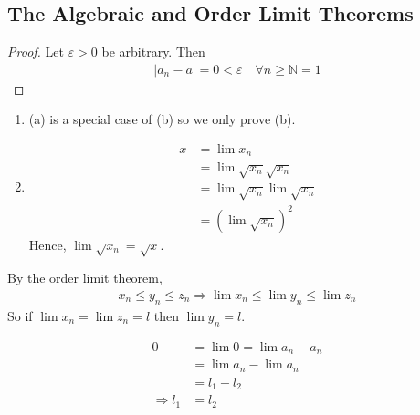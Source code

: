 \subsection{The Algebraic and Order Limit Theorems}

\begin{proof}
    Let $\varepsilon > 0$ be arbitrary. Then 
    \begin{align*}
        |a_n - a| = 0 < \varepsilon \quad \forall n \geq \mathbb{N} = 1
    \end{align*}
\end{proof}

\begin{enumerate}[label=(\alph*)]
    \item 
    (a) is a special case of (b) so we only prove (b).

    \item 
    \begin{align*}
        x &= \lim x_n \\
        &= \lim{\sqrt{x_n} \sqrt{x_n}} \\
        &= \lim \sqrt{x_n} \lim \sqrt{x_n} \\
        &= (\lim \sqrt{x_n})^2 
    \end{align*}
    Hence, $\lim \sqrt{x_n} = \sqrt x$.
\end{enumerate}


By the order limit theorem,
\begin{align*}
    x_n \leq y_n \leq z_n \Rightarrow \lim x_n \leq \lim  y_n \leq \lim z_n
\end{align*}
So if $\lim x_n = \lim z_n = l$ then $\lim y_n = l$.

\begin{align*}
    0 &= \lim 0 = \lim{a_n - a_n} \\
    &= \lim a_n - \lim a_n \\
    &= l_1 - l_2 \\
    \Rightarrow l_1 &= l_2
\end{align*}


